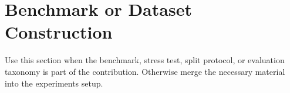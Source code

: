 \section{Benchmark or Dataset Construction}

Use this section when the benchmark, stress test, split protocol, or evaluation
taxonomy is part of the contribution. Otherwise merge the necessary material
into the experiments setup.
